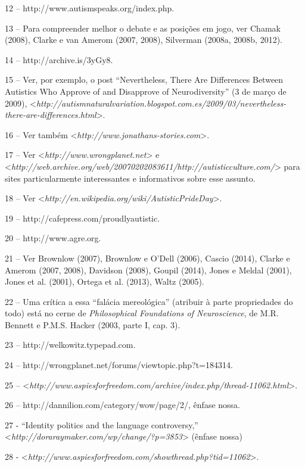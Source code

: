 12 -- http://www.autismspeaks.org/index.php.

13 -- Para compreender melhor o debate e as posições em jogo, ver Chamak
(2008), Clarke e van Amerom (2007, 2008), Silverman (2008a, 2008b,
2012).

14 -- http://archive.is/3yGy8.

15 -- Ver, por exemplo, o post ``Nevertheless, There Are Differences
Between Autistics Who Approve of and Disapprove of Neurodiversity'' (3
de março de 2009),
\textless{}\emph{http://autismnaturalvariation.blogspot.com.es/2009/03/nevertheless-there-are-differences.html}\textgreater{}.

16 -- Ver também \textless{}\emph{http://www.jonathans-stories.com}\textgreater{}.

17 -- Ver \textless{}\emph{http://www.wrongplanet.net}\textgreater{} e
\textless{}\emph{http://web.archive.org/web/20070202083611/http://autisticculture.com/}\textgreater{}
para sites particularmente interessantes e informativos sobre esse
assunto.

18 -- Ver \textless{}\emph{http://en.wikipedia.org/wiki/AutisticPrideDay}\textgreater{}.

19 -- http://cafepress.com/proudlyautistic.

20 -- http://www.agre.org.

21 -- Ver Brownlow (2007), Brownlow e O'Dell (2006), Cascio (2014),
Clarke e Amerom (2007, 2008), Davidson (2008), Goupil (2014), Jones e
Meldal (2001), Jones et al. (2001), Ortega et al. (2013), Waltz (2005).

22 -- Uma crítica a essa ``falácia mereológica'' (atribuir à parte
propriedades do todo) está no cerne de \emph{Philosophical Foundations
of Neuroscience}, de M.R. Bennett e P.M.S. Hacker (2003, parte I, cap.
3).

23 -- http://welkowitz.typepad.com.

24 -- http://wrongplanet.net/forums/viewtopic.php?t=184314.

25 --
\textless{}\emph{http://www.aspiesforfreedom.com/archive/index.php/thread-11062.html}\textgreater{}.

26 -- http://dannilion.com/category/wow/page/2/, ênfase nossa.

27 - ``Identity politics and the language controversy,''
\textless{}\emph{http://doraraymaker.com/wp/change/?p=3853}\textgreater{} (ênfase nossa)

28 - \textless{}\emph{http://www.aspiesforfreedom.com/showthread.php?tid=11062}\textgreater{}.

